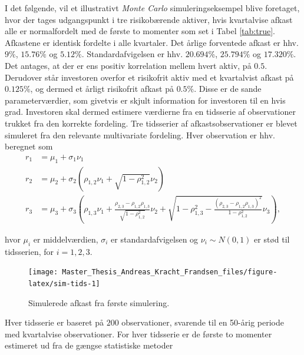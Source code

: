 \documentclass[
  a4paper,
  oneside]{memoir}
\begin{document}
I det følgende, vil et illustrativt \emph{Monte Carlo} simuleringseksempel blive foretaget, hvor der tages udgangspunkt i tre risikobærende aktiver, hvis kvartalvise afkast alle er normalfordelt med de første to momenter som set i Tabel \ref{tab:true}. Afkastene er identisk fordelte i alle kvartaler. Det årlige forventede afkast er hhv. \(9\%\), \(15.76\%\) og \(5.12\%\). Standardafvigelsen er hhv. \(20.694\%\), \(25.794\%\) og \(17.320\%\). Det antages, at der er ens positiv korrelation mellem hvert aktiv, på \(0.5\). Derudover står investoren overfor et risikofrit aktiv med et kvartalvist afkast på \(0.125\%\), og dermed et årligt risikofrit afkast på \(0.5\%\). Disse er de sande parameterværdier, som givetvis er skjult information for investoren til en hvis grad. Investoren skal dermed estimere værdierne fra en tidsserie af observationer trukket fra den korrekte fordeling. Tre tidsserier af afkastsobservationer er blevet simuleret fra den relevante multivariate fordeling. Hver observation er hhv. beregnet som
\begin{align*}
r_1 &= \mu_1 + \sigma_1\nu_1\\
r_2 &= \mu_2 + \sigma_2\left(\rho_{1,2}\nu_1 + \sqrt{1-\rho_{1,2}^2}\nu_2\right)\\
r_3 &= \mu_3 + \sigma_3 \left( \rho_{1,3} \nu_1+ \frac{ \rho_{2,3}-\rho_{1,2}\rho_{1,3} }{\sqrt{1-\rho_{1,2}^2}}\nu_2+\sqrt{1-\rho_{1,3}^2 -\frac{\left(\rho_{2,3}-\rho_{1,2}\rho_{1,3}\right)^2}{1-\rho_{1,2}^2}}\nu_3\right),
\end{align*}

hvor \(\mu_i\) er middelværdien, \(\sigma_i\) er standardafvigelsen og \(\nu_i\sim N(0,1)\) er stød til tidsserien, for \(i=1,2,3\).

\begin{figure}[H]

{\centering \texttt{[image: Master\_Thesis\_Andreas\_Kracht\_Frandsen\_files/figure-latex/sim-tids-1]} 

}

\caption{Simulerede afkast fra første simulering.}\label{fig:sim-tids}
\end{figure}

Hver tidsserie er baseret på \(200\) observationer, svarende til en 50-årig periode med kvartalvise observationer. For hver tidsserie er de første to momenter estimeret ud fra de gængse statistiske metoder
\end{document}

